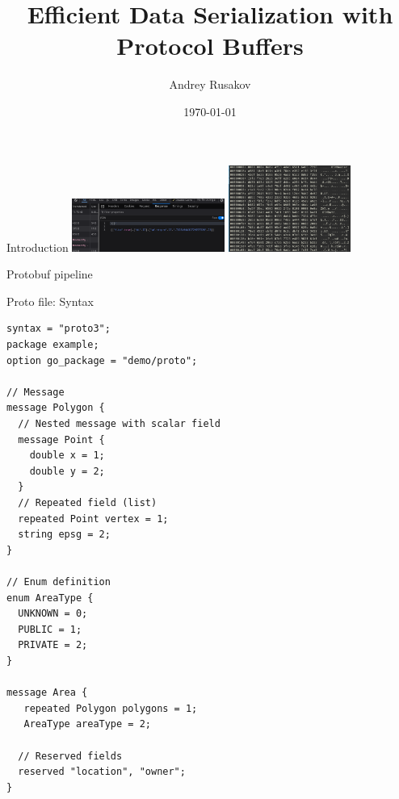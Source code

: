 \documentclass{beamer}
\title{Efficient Data Serialization with Protocol Buffers}
\author{Andrey Rusakov}
\date{\today}
\begin{document}
\begin{frame}
\titlepage
\end{frame}

\begin{frame}{Introduction}
\centering
\includegraphics[width=5cm]{gmail-proto}
\includegraphics[angle=45,width=4cm]{planet-header}
\end{frame}

\begin{frame}[fragile]{Protobuf pipeline}
  \begin{center}
  \end{center}
\end{frame}

\begin{frame}[fragile]{Proto file: Syntax}
\begin{lstlisting}[caption={Typical protocol buffer file}]
syntax = "proto3";
package example;
option go_package = "demo/proto";

// Message
message Polygon {
  // Nested message with scalar field
  message Point {
    double x = 1;
    double y = 2;
  }
  // Repeated field (list)
  repeated Point vertex = 1;
  string epsg = 2;
}

// Enum definition
enum AreaType {
  UNKNOWN = 0;
  PUBLIC = 1;
  PRIVATE = 2;
}

message Area {
   repeated Polygon polygons = 1;
   AreaType areaType = 2;

  // Reserved fields
  reserved "location", "owner";
}
\end{lstlisting}
\end{frame}
\end{document}
